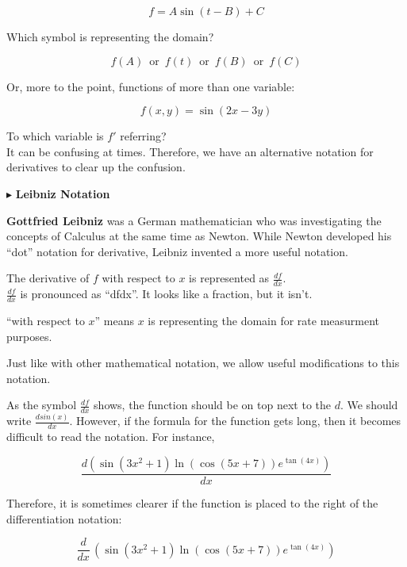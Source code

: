 \documentclass{ximera}
\begin{document}
\[
f = A \sin(t - B) + C
\]

Which symbol is representing the domain?


\[
f(A)   \, \text{ or } \, f(t)   \, \text{ or } \, f(B)   \, \text{ or } \, f(C)   
\]


Or, more to the point, functions of more than one variable:


\[
f(x, y) = \sin(2x - 3y)
\]

To which variable is $f'$ referring? \\






It can be confusing at times.  Therefore, we have an alternative notation for derivatives to clear up the confusion.



$\blacktriangleright$  \textbf{\textcolor{purple!85!blue}{Leibniz Notation}}


\textbf{Gottfried Leibniz} was a German mathematician who was investigating the concepts of Calculus at the same time as Newton.  While Newton developed his ``dot'' notation for derivative, Leibniz invented a more useful notation.


The derivative of $f$ with respect to $x$ is represented as $\frac{df}{dx}$. \\

$\frac{df}{dx}$ is pronounced as ``dfdx''.  It looks like a fraction, but it isn't.


``with respect to $x$'' means $x$ is representing the domain for rate measurment purposes. 



\begin{notation}


Just like with other mathematical notation, we allow useful modifications to this notation.



As the symbol $\frac{df}{dx}$ shows, the function should be on top next to the $d$.    We should write $\frac{d sin(x)}{dx}$.  However, if the formula for the function gets long, then it becomes difficult to read the notation. For instance,

\[
\frac{d (\sin(3x^2+1)\ln(\cos(5x+7))e^{\tan(4x)})}{dx}
\]


Therefore, it is sometimes clearer if the function is placed to the right of the differentiation notation:




\[
\frac{d}{dx} \, (\sin(3x^2+1)\ln(\cos(5x+7))e^{\tan(4x)})
\]






\end{notation}
\end{document}
